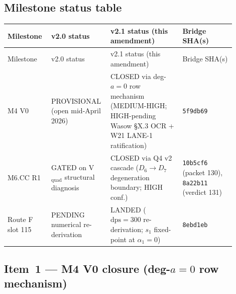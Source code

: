\documentclass[11pt,a4paper]{article}
\theoremstyle{definition}
\theoremstyle{remark}
\begin{document}
\subsection{Milestone status table}
\label{sec:closure-cascade-table}

\begin{center}
\renewcommand{\arraystretch}{1.20}
\begin{longtable}{@{}p{0.18\linewidth} p{0.20\linewidth} p{0.30\linewidth} p{0.22\linewidth}@{}}
\toprule
Milestone & v2.0 status & v2.1 status (this amendment) & Bridge SHA(s) \\
\midrule
\endfirsthead
\toprule
Milestone & v2.0 status & v2.1 status (this amendment) & Bridge SHA(s) \\
\midrule
\endhead
M4 V0 & PROVISIONAL (open mid-April 2026) & CLOSED via deg-$a=0$ row mechanism (MEDIUM-HIGH; HIGH-pending Wasow \S X.3 OCR + W21 LANE-1 ratification) & \texttt{5f9db69} \\
M6.CC R1 & GATED on V$_{\mathrm{quad}}$ structural diagnosis & CLOSED via Q4 v2 cascade ($D_6 \to D_7$ degeneration boundary; HIGH conf.) & \texttt{10b5cf6} (packet 130), \texttt{8a22b11} (verdict 131) \\
Route F slot 115 & PENDING numerical re-derivation & LANDED ($\mathrm{dps}=300$ re-derivation; $s_1$ fixed-point at $\alpha_1=0$) & \texttt{8ebd1eb} \\
\bottomrule
\end{longtable}
\end{center}

\subsection{Item~1 --- M4 V0 closure (deg-$a=0$ row mechanism)}
\label{sec:closure-cascade-m4}
\end{document}
